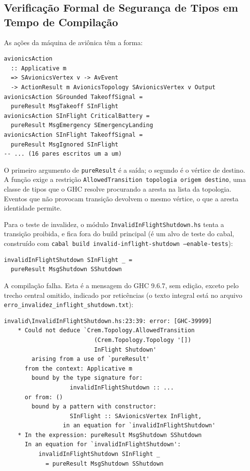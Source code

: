 \documentclass[12pt,a4paper]{article}
\begin{document}
\subsection{Verificação Formal de Segurança de Tipos em Tempo de Compilação}

As ações da máquina de aviônica têm a forma:

\begin{verbatim}
avionicsAction
  :: Applicative m
  => SAvionicsVertex v -> AvEvent
  -> ActionResult m AvionicsTopology SAvionicsVertex v Output
avionicsAction SGrounded TakeoffSignal =
  pureResult MsgTakeoff SInFlight
avionicsAction SInFlight CriticalBattery =
  pureResult MsgEmergency SEmergencyLanding
avionicsAction SInFlight TakeoffSignal =
  pureResult MsgIgnored SInFlight
-- ... (16 pares escritos um a um)
\end{verbatim}

O primeiro argumento de \texttt{pureResult} é a saída; o segundo é o vértice de destino. A função exige a restrição \texttt{AllowedTransition topologia origem destino}, uma classe de tipos que o GHC resolve procurando a aresta na lista da topologia. Eventos que não provocam transição devolvem o mesmo vértice, o que a aresta identidade permite.

Para o teste de invalidez, o módulo \texttt{InvalidInFlightShutdown.hs} tenta a transição proibida, e fica fora do build principal (é um alvo de teste do cabal, construído com \texttt{cabal build invalid-inflight-shutdown --enable-tests}):

\begin{verbatim}
invalidInFlightShutdown SInFlight _ =
  pureResult MsgShutdown SShutdown
\end{verbatim}

A compilação falha. Esta é a mensagem do GHC 9.6.7, sem edição, exceto pelo trecho central omitido, indicado por reticências (o texto integral está no arquivo \texttt{erro\_invalidez\_inflight\_shutdown.txt}):

\begin{verbatim}
invalid\InvalidInFlightShutdown.hs:23:39: error: [GHC-39999]
    * Could not deduce `Crem.Topology.AllowedTransition
                          (Crem.Topology.Topology '[])
                          InFlight Shutdown'
        arising from a use of `pureResult'
      from the context: Applicative m
        bound by the type signature for:
                   invalidInFlightShutdown :: ...
      or from: ()
        bound by a pattern with constructor:
                   SInFlight :: SAvionicsVertex InFlight,
                 in an equation for `invalidInFlightShutdown'
    * In the expression: pureResult MsgShutdown SShutdown
      In an equation for `invalidInFlightShutdown':
          invalidInFlightShutdown SInFlight _
            = pureResult MsgShutdown SShutdown
\end{verbatim}
\end{document}
